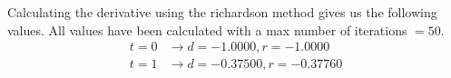 Calculating the derivative using the richardson method gives us the following values. All  values have been calculated with a max number of iterations $= 50$.
\begin{align*}
  t = 0 &\rightarrow d = -1.0000, r =  -1.0000 \\
  t = 1 &\rightarrow d = -0.37500, r = -0.37760
\end{align*}
